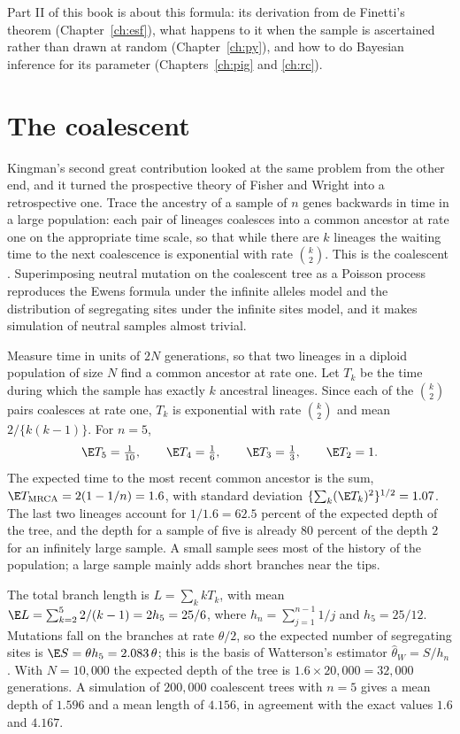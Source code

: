 Part II of this book is about this formula: its derivation from de Finetti's theorem
(Chapter~\ref{ch:esf}), what happens to it when the sample is ascertained rather than drawn at
random (Chapter~\ref{ch:py}), and how to do Bayesian inference for its parameter
(Chapters~\ref{ch:pig} and \ref{ch:rc}).

\section{The coalescent}

Kingman's second great contribution looked at the same problem from the other end, and it turned
the prospective theory of Fisher and Wright into a retrospective one. Trace the ancestry of a
sample of $n$ genes backwards in time in a large population: each pair of lineages coalesces into a
common ancestor at rate one on the appropriate time scale, so that while there are $k$ lineages the
waiting time to the next coalescence is exponential with rate $\binom{k}{2}$. This is the
coalescent \citep{intro:kingman1982}. Superimposing neutral mutation on the coalescent tree as a
Poisson process reproduces the Ewens formula under the infinite alleles model and the distribution
of segregating sites under the infinite sites model, and it makes simulation of neutral samples
almost trivial.

\begin{example}\label{intro:ex:coal}
Measure time in units of $2N$ generations, so that two lineages in a diploid population of size
$N$ find a common ancestor at rate one. Let $T_k$ be the time during which the sample has exactly
$k$ ancestral lineages. Since each of the $\binom k2$ pairs coalesces at rate one, $T_k$ is
exponential with rate $\binom k2$ and mean $2/\{k(k-1)\}$. For $n=5$,
\begin{equation*}
\E T_5=\tfrac1{10},\qquad \E T_4=\tfrac16,\qquad \E T_3=\tfrac13,\qquad \E T_2=1 .
\end{equation*}
The expected time to the most recent common ancestor is the sum,
$\E T_{\mathrm{MRCA}}=2(1-1/n)=1.6$, with standard deviation
$\{\sum_k(\E T_k)^2\}^{1/2}=1.07$. The last two lineages account for $1/1.6=62.5$ percent of the
expected depth of the tree, and the depth for a sample of five is already $80$ percent of the
depth $2$ for an infinitely large sample. A small sample sees most of the history of the
population; a large sample mainly adds short branches near the tips.

The total branch length is $L=\sum_k kT_k$, with mean $\E L=\sum_{k=2}^{5}2/(k-1)=2h_5=25/6$, where
$h_n=\sum_{j=1}^{n-1}1/j$ and $h_5=25/12$. Mutations fall on the branches at rate $\theta/2$, so
the expected number of segregating sites is $\E S=\theta h_5=2.083\,\theta$; this is the basis of
Watterson's estimator $\hat\theta_W=S/h_n$ \citep{intro:watterson1975}. With $N=10{,}000$ the
expected depth of the tree is $1.6\times20{,}000=32{,}000$ generations. A simulation of $200{,}000$
coalescent trees with $n=5$ gives a mean depth of $1.596$ and a mean length of $4.156$, in
agreement with the exact values $1.6$ and $4.167$.
\end{example}

